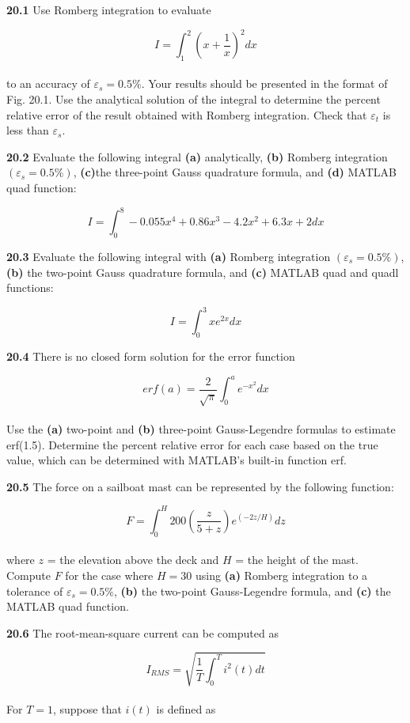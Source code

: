 \documentclass[../main.tex]{subfiles}
\begin{document}
\begin{multicols}{2}
\textbf{20.1} Use Romberg integration to evaluate

	$$I = \int^{2}_{1} \left( x+\dfrac{1}{x} \right)^{2} dx$$\\
to an accuracy of $\varepsilon_{s} = 0.5\%$. Your results should be presented
in the format of Fig. 20.1. Use the analytical solution of the
integral to determine the percent relative error of the result obtained with Romberg integration. Check that $\varepsilon_{t}$ is less than $\varepsilon_{s}$.

\textbf{20.2} Evaluate the following integral \textbf{(a)} analytically,
\textbf{(b)} Romberg integration $(\varepsilon_{s} = 0.5\%)$, \textbf{(c)}the three-point Gauss quadrature formula, and \textbf{(d)} MATLAB quad function:

	$$I= \int^{8}_{0} -0.055x^{4} + 0.86x^{3} - 4.2x^{2} + 6.3x + 2dx$$
	
\textbf{20.3} Evaluate the following integral with \textbf{(a)} Romberg integration $(\varepsilon_{s} = 0.5\%)$, \textbf{(b)} the two-point Gauss quadrature
formula, and \textbf{(c)} MATLAB quad and quadl functions:

	$$I = \int^{3}_{0} xe^{2x} dx$$
	
\textbf{20.4} There is no closed form solution for the error function

	$$erf(a) = \dfrac{2}{\sqrt{\pi}} \int^{a}_{0} e^{-x^{2}} dx$$\\
Use the \textbf{(a)} two-point and \textbf{(b)} three-point Gauss-Legendre
formulas to estimate erf(1.5). Determine the percent relative
error for each case based on the true value, which can be determined with MATLAB's built-in function erf.

\textbf{20.5} The force on a sailboat mast can be represented by the
following function:

	$$F= \int^{H}_{0} 200 \left(\dfrac{z}{5+z} \right) e^(-2z/H) dz $$\\
where $z$ = the elevation above the deck and $H$ = the height
of the mast. Compute $F$ for the case where $H = 30$ using
\textbf{(a)} Romberg integration to a tolerance of $\varepsilon_{s} = 0.5\%$, \textbf{(b)} the
two-point Gauss-Legendre formula, and \textbf{(c)} the MATLAB
quad function.

\textbf{20.6} The root-mean-square current can be computed as

	$$I_{RMS} = \sqrt{\dfrac{1}{T} \int^{T}_{0} i^{2} (t) dt}$$\\
For $T = 1$, suppose that $i(t)$ is defined as


\end{multicols}
\end{document}

